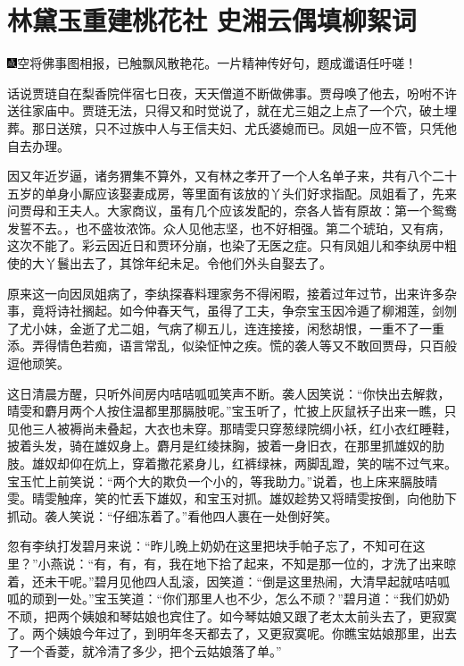
\chapter{林黛玉重建桃花社 史湘云偶填柳絮词}

{\includegraphics[width=3mm]{../Images/00005}\kaishu 空将佛事图相报，已触飘风散艳花。一片精神传好句，题成谶语任吁嗟！}

话说贾琏自在梨香院伴宿七日夜，天天僧道不断做佛事。贾母唤了他去，吩咐不许送往家庙中。贾琏无法，只得又和时觉说了，就在尤三姐之上点了一个穴，破土埋葬。那日送殡，只不过族中人与王信夫妇、尤氏婆媳而已。凤姐一应不管，只凭他自去办理。

因又年近岁逼，诸务猬集不算外，又有林之孝开了一个人名单子来，共有八个二十五岁的单身小厮应该娶妻成房，等里面有该放的丫头们好求指配。凤姐看了，先来问贾母和王夫人。大家商议，虽有几个应该发配的，奈各人皆有原故：第一个鸳鸯发誓不去。，也不盛妆浓饰。众人见他志坚，也不好相强。第二个琥珀，又有病，这次不能了。彩云因近日和贾环分崩，也染了无医之症。只有凤姐儿和李纨房中粗使的大丫鬟出去了，其馀年纪未足。令他们外头自娶去了。

原来这一向因凤姐病了，李纨探春料理家务不得闲暇，接着过年过节，出来许多杂事，竟将诗社搁起。如今仲春天气，虽得了工夫，争奈宝玉因冷遁了柳湘莲，剑刎了尤小妹，金逝了尤二姐，气病了柳五儿，连连接接，闲愁胡恨，一重不了一重添。弄得情色若痴，语言常乱，似染怔忡之疾。慌的袭人等又不敢回贾母，只百般逗他顽笑。

这日清晨方醒，只听外间房内咭咭呱呱笑声不断。袭人因笑说：``你快出去解救，晴雯和麝月两个人按住温都里那膈肢呢。''宝玉听了，忙披上灰鼠袄子出来一瞧，只见他三人被褥尚未叠起，大衣也未穿。那晴雯只穿葱绿院绸小袄，红小衣红睡鞋，披着头发，骑在雄奴身上。麝月是红绫抹胸，披着一身旧衣，在那里抓雄奴的肋肢。雄奴却仰在炕上，穿着撒花紧身儿，红裤绿袜，两脚乱蹬，笑的喘不过气来。宝玉忙上前笑说：``两个大的欺负一个小的，等我助力。''说着，也上床来膈肢晴雯。晴雯触痒，笑的忙丢下雄奴，和宝玉对抓。雄奴趁势又将晴雯按倒，向他肋下抓动。袭人笑说：``仔细冻着了。''看他四人裹在一处倒好笑。

忽有李纨打发碧月来说：``昨儿晚上奶奶在这里把块手帕子忘了，不知可在这里？''小燕说：``有，有，有，我在地下拾了起来，不知是那一位的，才洗了出来晾着，还未干呢。''碧月见他四人乱滚，因笑道：``倒是这里热闹，大清早起就咭咭呱呱的顽到一处。''宝玉笑道：``你们那里人也不少，怎么不顽？''碧月道：``我们奶奶不顽，把两个姨娘和琴姑娘也宾住了。如今琴姑娘又跟了老太太前头去了，更寂寞了。两个姨娘今年过了，到明年冬天都去了，又更寂寞呢。你瞧宝姑娘那里，出去了一个香菱，就冷清了多少，把个云姑娘落了单。''

